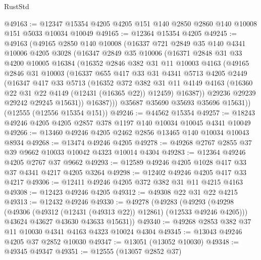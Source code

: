 \begin{lexlean}{RustStd}
\begin{coremodule}
@49163 := @12347 @15354 @4205 @4205 @151 @140 @2850 @2860 @140 @10008 @151 @5033 @10034 @10049
@49165 := @12364 @15354 @4205
@49245 := @49163
    (@49165
      @2850
      @140
      @10008
      (@16337
        @721
        @2849
        @35
        @140
        @4341
        @10006
        @4205
        @3028
        (@16347
          @2849
          @35
          @10006
          (@16371
            @2848
            @31
            @33
            @4200
            @10005
            @16384
            (@16352
              @2846
              @382
              @31
              @11
              @10003
              @4163
              (@49165
                @2846
                @31
                @10003
                (@16337
                  @655
                  @417
                  @33
                  @31
                  @4341
                  @5713
                  @4205
                  @2449
                  (@16347
                    @417
                    @33
                    @5713
                    (@16352
                      @372
                      @382
                      @31
                      @11
                      @4149
                      @4163
                      (@16360 @22 @31 @22 @4149 (@12431 (@16365 @22)) @12459)
                      @16387))
                  @29236
                  @29239
                  @29242
                  @29245
                  @15631))
              @16387)))
        @35687
        @35690
        @35693
        @35696
        @15631))
    (@12555 (@12556 @15354 @151))
@49246 := @44562 @15354
@49257 := @18243 @49246 @4205 @4205 @2857 @378 @1197 @140 @10034 @10045 @4341 @10049
@49266 := @13460 @49246 @4205 @2462 @2856 @13465 @140 @10034 @10043 @8934
@49268 := @13474 @49246 @4205
@49278 := @49268 @2767 @2855 @37 @39 @9662 @10033 @10042 @4323 @10014 @4304
@49283 := @12364 @49246 @4205 @2767 @37 @9662
@49293 := @12589 @49246 @4205 @1028 @417 @33 @37 @4341 @4217 @4205 @3264
@49298 := @12402 @49246 @4205 @417 @33 @4217
@49306 := @12411 @49246 @4205 @372 @382 @31 @11 @4215 @4163
@49308 := @12423 @49246 @4205
@49312 := @49308 @22 @31 @22 @4215
@49313 := @12432 @49246
@49330 := @49278
    (@49283
      (@49293
        (@49298 (@49306 (@49312 (@12431 (@49313 @22)) @12861) (@12533 @49246 @4205)))
        @43624
        @43627
        @43630
        @43633
        @15631))
@49340 := @49268 @2853 @382 @37 @11 @10030 @4341 @4163 @4323 @10024 @4304
@49345 := @13043 @49246 @4205 @37 @2852 @10030
@49347 := @13051 (@13052 @10030)
@49348 := @49345 @49347
@49351 := @12555 (@13057 @2852 @37)

\end{coremodule}
\end{lexlean}
